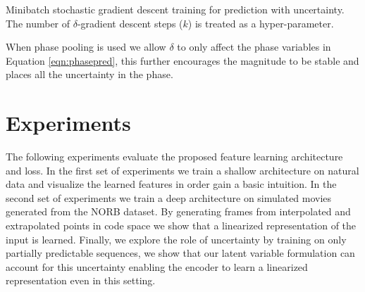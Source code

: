 \begin{algorithm}
\caption{Minibatch stochastic gradient descent training for prediction with uncertainty. The number of $\delta$-gradient descent steps ($k$) is treated as a hyper-parameter. }
\begin{algorithmic}
\ENDFOR
{}
\ENDFOR
\end{algorithmic} 
\end{algorithm}
When phase pooling is used we allow $\delta$ to only affect the phase variables in Equation \ref{eqn:phasepred}, this further encourages the magnitude to be stable and places all the uncertainty in the phase.   

\section{Experiments} 
\label{sec:experiments}
The following experiments evaluate the proposed feature learning architecture and loss. In the first set of experiments we train a shallow architecture on natural data and visualize the learned features in order gain a basic intuition. In the second set of experiments we train a deep architecture on simulated movies generated from the NORB dataset. By generating frames from interpolated and extrapolated points in code space we show that a linearized representation of the input is learned. Finally, we explore the role of uncertainty by training on only partially predictable sequences, we show that our latent variable formulation can account for this uncertainty enabling the encoder to learn a linearized representation even in this setting.   

